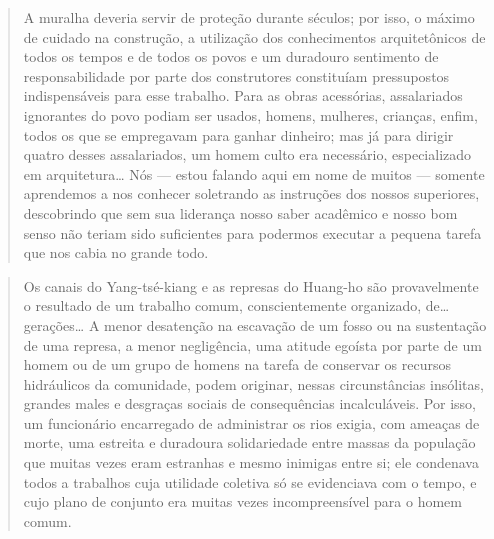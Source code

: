 \begin{quote}
A muralha deveria servir de proteção durante séculos; por isso, o
 máximo de cuidado na construção, a utilização dos conhecimentos
 arquitetônicos de todos os tempos e de todos os povos e um duradouro
 sentimento de responsabilidade por parte dos construtores constituíam
 pressupostos indispensáveis para esse trabalho. Para as obras acessórias,
 assalariados ignorantes do povo podiam ser usados, homens, mulheres,
 crianças, enfim, todos os que se empregavam para ganhar dinheiro; mas já
 para dirigir quatro desses assalariados, um homem culto era necessário,
 especializado em arquitetura\ldots{} Nós --- estou falando aqui em nome de
 muitos --- somente aprendemos a nos conhecer soletrando as instruções
 dos nossos superiores, descobrindo que sem sua liderança nosso saber
 acadêmico e nosso bom senso não teriam sido suficientes para podermos
 executar a pequena tarefa que nos cabia no grande todo. 
\end{quote}


\begin{quote}
Os canais do
Yang-tsé-kiang e as represas do Huang-ho são provavelmente o resultado
de um trabalho comum, conscientemente organizado, de\ldots{} gerações\ldots{} A
menor desatenção na escavação de um fosso ou na sustentação de uma
represa, a menor negligência, uma atitude egoísta por parte de um homem
ou de um grupo de homens na tarefa de conservar os recursos hidráulicos
da comunidade, podem originar, nessas circunstâncias insólitas, grandes
males e desgraças sociais de consequências incalculáveis. Por isso, um
funcionário encarregado de administrar os rios exigia, com ameaças de
morte, uma estreita e duradoura solidariedade entre massas da população
que muitas vezes eram estranhas e mesmo inimigas entre si; ele condenava
todos a trabalhos cuja utilidade coletiva só se evidenciava com o tempo,
e cujo plano de conjunto era muitas vezes incompreensível para o homem
comum.
\end{quote}


